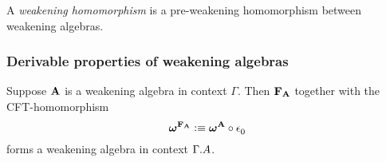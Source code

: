 \begin{defn}
A \emph{weakening homomorphism} is a pre-weakening homomorphism between
weakening algebras.
\end{defn}

\subsubsection{Derivable properties of weakening algebras}

\begin{thm}
Suppose $\mathbf{A}$ is a weakening algebra in context $\Gamma$. Then
$\mathbf{F}_{\mathbf{A}}$ together with the CFT-homomorphism
\begin{equation*}
\cftwk{\cftfamalg{\cftalg{A}}}
  \defeq \jcomp{}{\cftctxext}{\cftwk{\cftalg{A}}}
\end{equation*}
forms a weakening algebra in context $\ctxext{\Gamma}{\cftalgc{\cftalg{A}}}$.
\end{thm}


